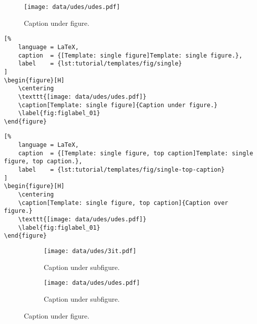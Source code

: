 
\begin{figure}[H]
    \centering
    \texttt{[image: data/udes/udes.pdf]}
    \caption[Template: single figure]{Caption under figure.}
    \label{fig:figlabel_01}
\end{figure}

\begin{lstlisting}[%
    language = LaTeX,
    caption  = {[Template: single figure]Template: single figure.},
    label    = {lst:tutorial/templates/fig/single}
]
\begin{figure}[H]
    \centering
    \texttt{[image: data/udes/udes.pdf]}
    \caption[Template: single figure]{Caption under figure.}
    \label{fig:figlabel_01}
\end{figure}
\end{lstlisting}

\begin{lstlisting}[%
    language = LaTeX,
    caption  = {[Template: single figure, top caption]Template: single figure, top caption.},
    label    = {lst:tutorial/templates/fig/single-top-caption}
]
\begin{figure}[H]
    \centering
    \caption[Template: single figure, top caption]{Caption over figure.}
    \texttt{[image: data/udes/udes.pdf]}
    \label{fig:figlabel_01}
\end{figure}
\end{lstlisting}


\begin{figure}[H]
    \centering
    \begin{subfigure}[t]{0.5\textwidth}
        \centering
        \texttt{[image: data/udes/3it.pdf]}
        \caption{Caption under subfigure.}
        \label{fig:figsublabel_01}
    \end{subfigure}%
    \begin{subfigure}[t]{0.5\textwidth}
        \centering
        \texttt{[image: data/udes/udes.pdf]}
        \caption{Caption under subfigure.}
        \label{fig:figsublabel_02}
    \end{subfigure}
    \caption[Template: figure with subfigures]{Caption under figure.}
    \label{fig:figlabel_02}
\end{figure}

